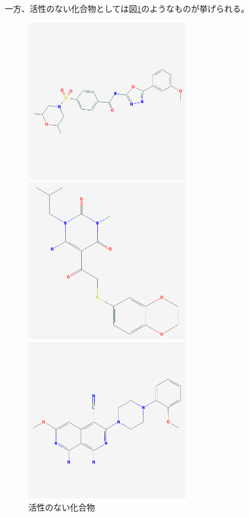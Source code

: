 \documentclass[a4j,11pt]{jarticle}
\begin{document}
一方、活性のない化合物としては図\ref{inactive}のようなものが挙げられる。

\begin{figure}[H]
	\begin{minipage}{0.33\hsize}
		\begin{center}
			\includegraphics[width=7cm, bb=0 0 500 500]{../pictures/inactive/1.png}
		\end{center}
	\end{minipage}
	\begin{minipage}{0.33\hsize}
		\begin{center}
			\includegraphics[width=7cm, bb=0 0 500 500]{../pictures/inactive/2.png}
		\end{center}
	\end{minipage}
	\begin{minipage}{0.33\hsize}
		\begin{center}
			\includegraphics[width=7cm, bb=0 0 500 500]{../pictures/inactive/3.png}
		\end{center}
	\end{minipage}
	\caption{活性のない化合物} \label{inactive}
\end{figure}
\end{document}
